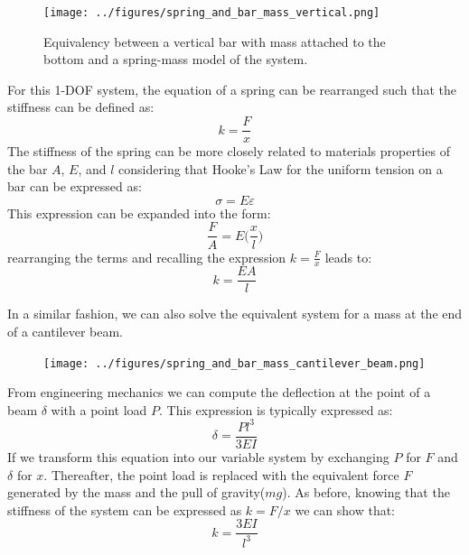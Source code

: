 \documentclass[12pt,letter]{article}
\numberwithin{ex}{section} %
\numberwithin{re}{section} %
\numberwithin{vcs}{section} %
\begin{document}
			
			\begin{figure}[H]
				\centering
				\texttt{[image: ../figures/spring\_and\_bar\_mass\_vertical.png]}
				\caption{Equivalency between a vertical bar with mass attached to the bottom and a spring-mass model of the system.}
				\label{fig:spring_and_bar_mass_vertical}
			\end{figure}
			
			For this 1-DOF system, the equation of a spring can be rearranged such that the stiffness can be defined as:
			\begin{equation}
				k=\frac{F}{x}
			\end{equation}
			The stiffness of the spring can be more closely related to materials properties of the bar $A$, $E$, and $l$ considering that Hooke's Law for the uniform tension on a bar can be expressed as:
			\begin{equation}
				\sigma = E \varepsilon
			\end{equation}			
			This expression can be expanded into the form:
			\begin{equation}
				\frac{F}{A} = E \Big( \frac{x}{l} \Big)
			\end{equation}					
			rearranging the terms and recalling the expression $k = \frac{F}{x}$ leads to:			
			\begin{equation}
				 k = \frac{EA}{l}
			\end{equation}				
		
			In a similar fashion, we can also solve the equivalent system for a mass at the end of a cantilever beam.
			\begin{figure}[H]
				\centering
				\texttt{[image: ../figures/spring\_and\_bar\_mass\_cantilever\_beam.png]}
			\end{figure}			
			From engineering mechanics we can compute the deflection at the point of a beam $\delta$ with a point load $P$. This expression is typically expressed as:
			\begin{equation}
				\delta = \frac{Pl^3}{3EI}
			\end{equation}					
			If we transform this equation into our variable system by exchanging $P$ for $F$ and $\delta$ for $x$. Thereafter, the point load is replaced with the equivalent force $F$ generated by the mass and the pull of gravity($mg$). As before, knowing that the stiffness of the system can be expressed as $k=F/x$ we can show that:
			\begin{equation}
				k = \frac{3EI}{l^3}
			\end{equation}	
\end{document}
